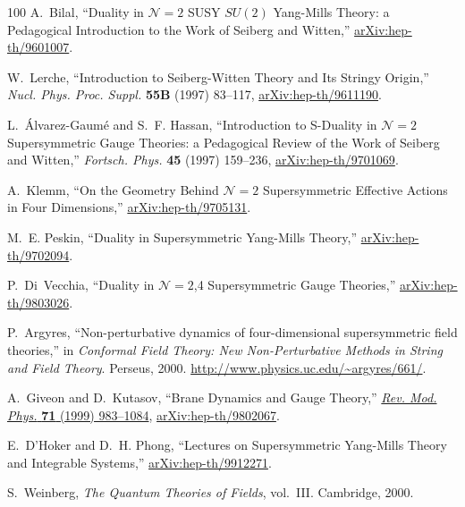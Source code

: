 \begin{thebibliography}{100}
A.~Bilal, ``{Duality in ${\mathcal{N}}\!=2$ SUSY $SU(2)$ Yang-Mills Theory: a Pedagogical Introduction to the Work of Seiberg and Witten},''
\href{http://arxiv.org/abs/hep-th/9601007}{{\ttfamily arXiv:hep-th/9601007}}.

W.~Lerche, ``{Introduction to Seiberg-Witten Theory and Its Stringy Origin},'' {\em Nucl. Phys. Proc. Suppl.} {\bfseries 55B} (1997) 83--117,
\href{http://arxiv.org/abs/hep-th/9611190}{{\ttfamily arXiv:hep-th/9611190}}.

L.~\'Alvarez-Gaum\'e and S.~F. Hassan, ``{Introduction to S-Duality in ${\mathcal{N}}\!=2$ Supersymmetric Gauge Theories: a Pedagogical Review of the Work of Seiberg and Witten},'' {\em Fortsch. Phys.} {\bfseries 45} (1997) 159--236,
\href{http://arxiv.org/abs/hep-th/9701069}{{\ttfamily arXiv:hep-th/9701069}}.

A.~Klemm, ``{On the Geometry Behind ${\mathcal{N}}\!=2$ Supersymmetric Effective Actions in Four Dimensions},''
\href{http://arxiv.org/abs/hep-th/9705131}{{\ttfamily arXiv:hep-th/9705131}}.

M.~E. Peskin, ``{Duality in Supersymmetric Yang-Mills Theory},''
\href{http://arxiv.org/abs/hep-th/9702094}{{\ttfamily arXiv:hep-th/9702094}}.

P.~Di~Vecchia, ``{Duality in ${\mathcal{N}}\!=2$,4 Supersymmetric Gauge Theories},''
\href{http://arxiv.org/abs/hep-th/9803026}{{\ttfamily arXiv:hep-th/9803026}}.

P.~Argyres, ``{Non-perturbative dynamics of four-dimensional supersymmetric field theories},'' in {\em Conformal Field Theory: New Non-Perturbative Methods in String and Field Theory}.
\newblock Perseus, 2000.
\newblock \url{http://www.physics.uc.edu/~argyres/661/}.

A.~Giveon and D.~Kutasov, ``{Brane Dynamics and Gauge Theory},''
\href{http://dx.doi.org/10.1103/RevModPhys.71.983}{{\em Rev. Mod. Phys.} {\bfseries 71} (1999) 983--1084},
\href{http://arxiv.org/abs/hep-th/9802067}{{\ttfamily arXiv:hep-th/9802067}}.

E.~D'Hoker and D.~H. Phong, ``{Lectures on Supersymmetric Yang-Mills Theory and Integrable Systems},''
\href{http://arxiv.org/abs/hep-th/9912271}{{\ttfamily arXiv:hep-th/9912271}}.

S.~Weinberg, {\em The Quantum Theories of Fields}, vol.~III.
\newblock Cambridge, 2000.


\end{thebibliography}
